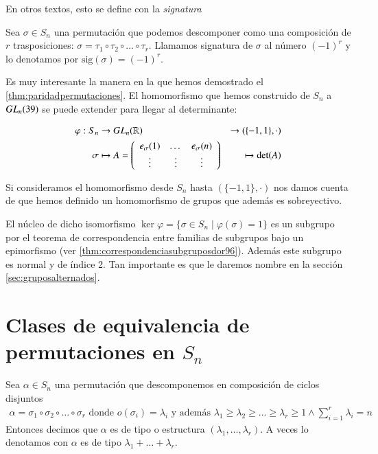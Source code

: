 En otros textos, esto se define con la \textit{signatura}

\begin{dfn}
	Sea $\sigma \in S_n$ una permutación que podemos descomponer como una composición de $r$ trasposiciones: $\sigma = \tau_1 \circ \tau_2 \circ \dots \circ \tau_r$. Llamamos signatura de $\sigma$ al número $(-1)^r$ y lo denotamos por $\text{sig}(\sigma) = (-1)^r$.
\end{dfn}

Es muy interesante la manera en la que hemos demostrado el \autoref{thm:paridadpermutaciones}. El homomorfismo que hemos construido de $S_n$ a $GL_n(39)$ se puede extender para llegar al determinante:

\begin{align*}
	\varphi : S_n &\to GL_n(\mathbb{R}) &\to (\{-1, 1\}, \cdot) \\
	\sigma &\mapsto A = \left(\begin{array}{ccc}
	e_\sigma(1) & \dots & e_\sigma(n) \\
	\vdots & \vdots & \vdots
	\end{array}\right) &\mapsto \det(A)
\end{align*}

Si consideramos el homomorfismo desde $S_n$ hasta $(\{-1, 1\}, \cdot)$ nos damos cuenta de que hemos definido un homomorfismo de grupos que además es sobreyectivo.

El núcleo de dicho isomorfismo $\ker \varphi = \{\sigma \in S_n \mid \varphi(\sigma) = 1\}$ es un subgrupo por el teorema de correspondencia entre familias de subgrupos bajo un epimorfismo (ver \autoref{thm:correspondenciasubgruposdor96}). Además este subgrupo es normal y de índice 2. Tan importante es que le daremos nombre en la sección \ref{sec:gruposalternados}.

\section{Clases de equivalencia de permutaciones en $S_n$}

\begin{dfn}
	Sea $\alpha \in S_n$ una permutación que descomponemos en composición de ciclos disjuntos
	\begin{align*}
		\alpha = \sigma_1 \circ \sigma_2 \circ \dots \circ \sigma_r\text{ donde } o(\sigma_i) = \lambda_i \text{ y además } \lambda_1  \geq \lambda_2 \geq \dots \geq \lambda_r\geq 1 \land \sum_{i=1}^{r} \lambda_i = n
	\end{align*}
	Entonces decimos que $\alpha$ es de tipo o estructura $(\lambda_1, \dots, \lambda_r)$. A veces lo denotamos con $\alpha$ es de tipo $\lambda_1 + \dots + \lambda_r$.
\end{dfn}

